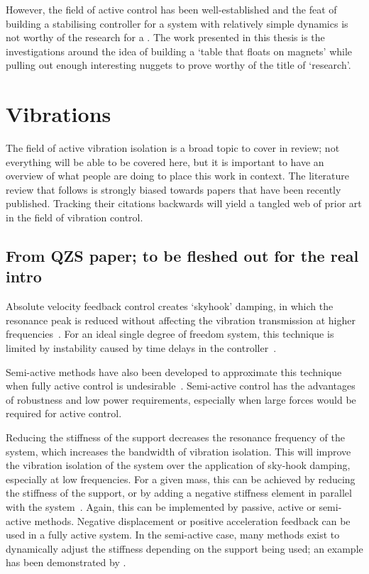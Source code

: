 However, the field of active control has been well-established and the feat of
building a stabilising controller for a system with relatively simple dynamics
is not worthy of the research for a \PhD. The work presented in this thesis is
the investigations around the idea of building a `table that floats on
magnets' while pulling out enough interesting nuggets to prove worthy of the
title of `research'.

\section{Vibrations}

The field of active vibration isolation is a broad topic to cover in review;
not everything will be able to be covered here, but it is important to have an
overview of what people are doing to place this work in context. The
literature review that follows is strongly biased towards papers that have
been recently published. Tracking their citations backwards will yield a
tangled web of prior art in the field of vibration control.

\subsection{From QZS paper; to be fleshed out for the real intro}

Absolute velocity feedback control creates `skyhook' damping, in which
the resonance peak is reduced without affecting the vibration
transmission at higher frequencies~\cite{yan2006}. For an ideal single
degree of freedom system, this technique is limited by instability
caused by time delays in the
controller~\cite{elliott2004,brennan2007}.

Semi-active methods have also been developed to approximate this
technique when fully active control is
undesirable~\cite{liu2002,liu2005,ahmadian2004}. Semi-active control
has the advantages of robustness and low power requirements,
especially when large forces would be required for active control.

Reducing the stiffness of the support decreases the resonance
frequency of the system, which increases the bandwidth of vibration
isolation. This will improve the vibration isolation of the system
over the application of sky-hook damping, especially at low
frequencies.  For a given mass, this can be achieved by reducing the
stiffness of the support, or by adding a negative stiffness element in
parallel with the system~\cite{lee2007,xing2005}. Again, this can be
implemented by passive, active or semi-active methods. Negative
displacement or positive acceleration feedback can be used in a fully
active system. In the semi-active case, many methods exist to
dynamically adjust the stiffness depending on the support being used;
an example has been demonstrated by \textcite{kidner2002}.

